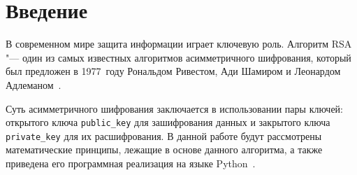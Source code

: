 \section{Введение}

В современном мире защита информации играет ключевую роль. Алгоритм RSA "--- один из самых известных алгоритмов асимметричного шифрования, который был предложен в 1977~году Рональдом Ривестом, Ади Шамиром и Леонардом Адлеманом~\cite{rsa_original}.

Суть асимметричного шифрования заключается в использовании пары ключей: открытого ключа \texttt{public\_key} для зашифрования данных и закрытого ключа \texttt{private\_key} для их расшифрования. В данной работе будут рассмотрены математические принципы, лежащие в основе данного алгоритма, а также приведена его программная реализация на языке Python~\cite{python_docs}.
